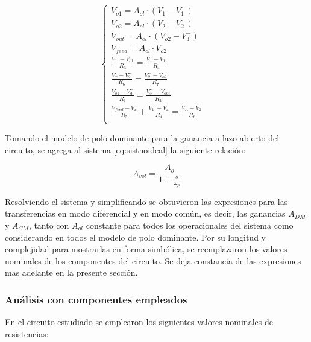 \begin{equation}
    \left\{
        \begin{array}{lllllllll}
            
            V_{o1} =  A_{ol}\cdot (V_1-V_1^-)&\\
            
            V_{o2} = A_{ol}\cdot (V_2-V_2^-)\\
            
            V_{out} = A_{ol}\cdot (V_{o2}-V_3^-)\\
            
            V_{feed} = A_{ol}\cdot V_{o2}\\

            \frac{V_1^- - V_{o1}}{R_3} = \frac{V_x - V_1^-}{R_4}\\

            \frac{V_{x}-V_2^-}{R_6} = \frac{V_2^- - V_{o2}}{R_7}\\

            \frac{V_{o1}-V_3^-}{R_1} = \frac{V_3^- - V_{out}}{R_2}\\

            \frac{V_{feed}-V_x}{R_5} + \frac{V_1^- - V_x}{R_4}= \frac{V_A - V_2^-}{R_6}\\
        \end{array}
    \right.
\label{eq:sistnoideal}
\end{equation}

Tomando el modelo de polo dominante para la ganancia a lazo abierto del circuito, se agrega al sistema \ref{eq:sistnoideal} la siguiente relación:

$$A_{vol} = \frac{A_o}{1+\frac{s}{\omega_p}}$$

Resolviendo el sistema y simplificando se obtuvieron las expresiones para las transferencias en modo diferencial y en modo común, es decir, las ganancias $A_{DM}$ y $A_{CM}$, tanto con $A_{ol}$ constante para todos los operacionales del sistema como considerando en todos el modelo de polo dominante. Por su longitud y complejidad para mostrarlas en forma simbólica, se reemplazaron los valores nominales de los componentes del circuito. Se deja constancia de las expresiones mas adelante en la presente sección.

\subsubsection{Análisis con componentes empleados}

En el circuito estudiado se emplearon los siguientes valores nominales de resistencias:

